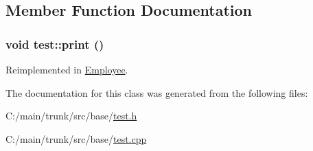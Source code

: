 \subsection{Member Function Documentation}
\hypertarget{classtest_a861706972dfd4e400a59f3d13e4f3710}{
\subsubsection[{print}]{\setlength{\rightskip}{0pt plus 5cm}void test::print ()}}
\label{classtest_a861706972dfd4e400a59f3d13e4f3710}


Reimplemented in \hyperlink{class_employee_a79556ad700627dba88049f487a34a762}{Employee}.

The documentation for this class was generated from the following files:\begin{DoxyCompactItemize}
\item 
C:/main/trunk/src/base/\hyperlink{test_8h}{test.h}\item 
C:/main/trunk/src/base/\hyperlink{test_8cpp}{test.cpp}\end{DoxyCompactItemize}
